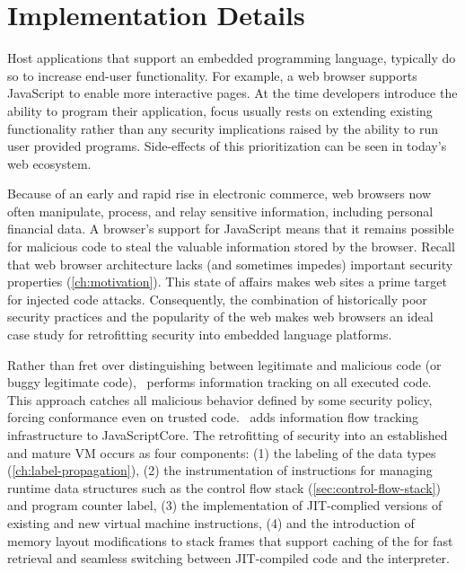 \chapter{Implementation Details}\label{ch:implementation}

Host applications that support an embedded programming language, typically do so to increase end-user functionality.
For example, a web browser supports JavaScript to enable more interactive pages.
At the time developers introduce the ability to program their application, focus usually rests on extending existing functionality rather than any security implications raised by the ability to run user provided programs.
Side-effects of this prioritization can be seen in today's web ecosystem.

Because of an early and rapid rise in electronic commerce, web browsers now often manipulate, process, and relay sensitive information, including personal financial data.
A browser's support for JavaScript means that it remains possible for malicious code to steal the valuable information stored by the browser.
Recall that web browser architecture lacks (and sometimes impedes) important security properties (\autoref{ch:motivation}).
This state of affairs makes web sites a prime target for injected code attacks.
Consequently, the combination of historically poor security practices and the popularity of the web makes web browsers an ideal case study for retrofitting security into embedded language platforms.

Rather than fret over distinguishing between legitimate and malicious code (or buggy legitimate code), \JitFlow\ performs information tracking on all executed code.
This approach catches all malicious behavior defined by some security policy, forcing conformance even on trusted code.
\JitFlow\ adds information flow tracking infrastructure to JavaScriptCore.
The retrofitting of security into an established and mature VM occurs as four components:
(1) the labeling of the data types (\autoref{ch:label-propagation}),
(2) the instrumentation of instructions for managing runtime data structures such as the control flow stack (\autoref{sec:control-flow-stack}) and program counter label,
(3) the implementation of JIT-complied versions of existing and new virtual machine instructions,
(4) and the introduction of memory layout modifications to stack frames that support caching of the \pclabel for fast retrieval and seamless switching between JIT-compiled code and the interpreter.

\newcommand{\popj}{\code{POPJ\_CFLABEL} }
\newcommand{\dup}{\code{DUP\_CFLABEL} }
\newcommand{\join}{\code{JOIN\_CFLABEL} }

